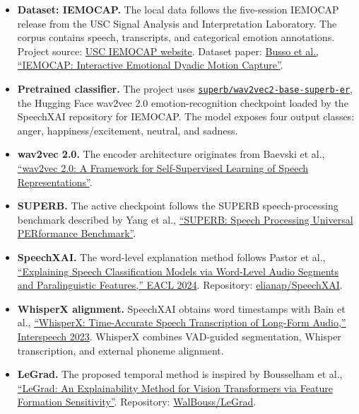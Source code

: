 \documentclass[11pt]{article}
\begin{document}
\begin{itemize}
  \item \textbf{Dataset: IEMOCAP.} The local data follows the five-session IEMOCAP release from the USC Signal Analysis and Interpretation Laboratory. The corpus contains speech, transcripts, and categorical emotion annotations. Project source: \href{https://sail.usc.edu/iemocap/}{USC IEMOCAP website}. Dataset paper: \href{https://sail.usc.edu/iemocap/Busso_2008_iemocap.pdf}{Busso et al., ``IEMOCAP: Interactive Emotional Dyadic Motion Capture''}.

  \item \textbf{Pretrained classifier.} The project uses \href{https://huggingface.co/superb/wav2vec2-base-superb-er}{\texttt{superb/wav2vec2-base-superb-er}}, the Hugging Face wav2vec 2.0 emotion-recognition checkpoint loaded by the SpeechXAI repository for IEMOCAP. The model exposes four output classes: anger, happiness/excitement, neutral, and sadness.

  \item \textbf{wav2vec 2.0.} The encoder architecture originates from Baevski et al., \href{https://arxiv.org/abs/2006.11477}{``wav2vec 2.0: A Framework for Self-Supervised Learning of Speech Representations''}.

  \item \textbf{SUPERB.} The active checkpoint follows the SUPERB speech-processing benchmark described by Yang et al., \href{https://arxiv.org/abs/2105.01051}{``SUPERB: Speech Processing Universal PERformance Benchmark''}.

  \item \textbf{SpeechXAI.} The word-level explanation method follows Pastor et al., \href{https://aclanthology.org/2024.eacl-long.136/}{``Explaining Speech Classification Models via Word-Level Audio Segments and Paralinguistic Features,'' EACL 2024}. Repository: \href{https://github.com/elianap/SpeechXAI}{elianap/SpeechXAI}.

  \item \textbf{WhisperX alignment.} SpeechXAI obtains word timestamps with Bain et al., \href{https://www.isca-archive.org/interspeech_2023/bain23_interspeech.html}{``WhisperX: Time-Accurate Speech Transcription of Long-Form Audio,'' Interspeech 2023}. WhisperX combines VAD-guided segmentation, Whisper transcription, and external phoneme alignment.

  \item \textbf{LeGrad.} The proposed temporal method is inspired by Bousselham et al., \href{https://arxiv.org/abs/2404.03214}{``LeGrad: An Explainability Method for Vision Transformers via Feature Formation Sensitivity''}. Repository: \href{https://github.com/WalBouss/LeGrad}{WalBouss/LeGrad}.
\end{itemize}
\end{document}
